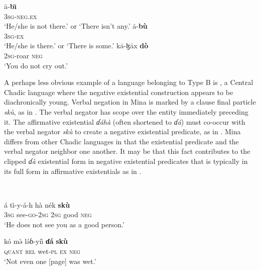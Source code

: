 \documentclass[output=paper,draft,draftmode,colorlinks,citecolor=brown]{langscibook}
\begin{document}
\ea\label{ex:muyang-none-some-cry}

\ea\label{ex:muyang-none}
\gll \=a-\textbf{b\=\i}\\
3\textsc{sg}-\textsc{neg.ex}\\
\glt `He/she is not there.' or `There isn't
any.' \ex\label{ex:muyang-some}
\gll \=a-\textbf{bù}\\
3\textsc{sg}-\textsc{ex}\\
\glt `He/she is there.' or `There is some.'
\ex\label{ex:muyang-cry}
\gll k\=a-ɮ\=ax \textbf{d\`o}\\ 2\textsc{sg}-roar
\textsc{neg}\\
\glt `You do not cry out.'
\z
\z

A perhaps less obvious example of a language belonging to Type B is
, a Central Chadic language where the negative existential
construction appears to be diachronically young. Verbal negation in Mina is
marked by a clause final particle \textit{skù}, as in .
The verbal negator has scope over the entity immediately preceding it. The
affirmative existential \textit{ɗáhà} (often shortened to
\textit{ɗá}) must co-occur with the verbal negator \textit{skù} to
create a negative existential predicate, as in . Mina
differs from other Chadic languages in that the existential predicate and
the verbal negator neighbor one another. It may be that this fact
contributes to the clipped \textit{ɗà} existential form in negative existential
predicates that is typically in its full form in affirmative existentials
as in .  

\ea\label{ex:mina-good-wet-granary}
\\ 

\ea\label{ex:mina-good}

\gll á t{ì}-y-á-h hà nék \textbf{skù}\\
3\textsc{sg} see-\textsc{go}-2\textsc{sg} 2\textsc{sg} good \textsc{neg}\\ 

\glt `He does not see you as a good person.'
\ex\label{ex:mina-wet} 

\gll kó m\`ə l\'əɓ-{yíì} \textbf{ɗá} \textbf{skù}\\
\textsc{quant} \textsc{rel} wet-\textsc{pl} \textsc{ex} \textsc{neg}\\ 

\glt `Not even one [page] was wet.'
\ex\label{ex:mina-granary}
\end{document}
